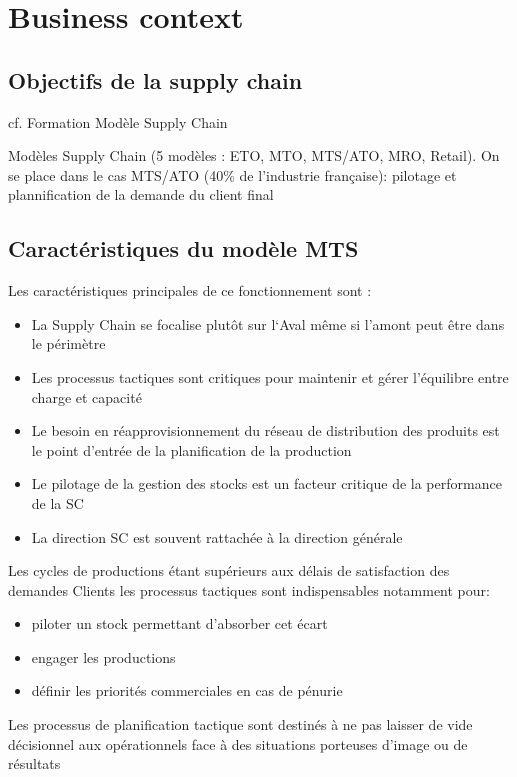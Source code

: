 \chapter{Business context}

\section{Objectifs de la supply chain}

cf. Formation Modèle Supply Chain

Modèles Supply Chain (5 modèles : ETO, MTO, MTS/ATO, MRO, Retail).
On se place dans le cas MTS/ATO (40\% de l'industrie française): pilotage et plannification de la demande du client final

\section{Caractéristiques du modèle MTS}

Les caractéristiques principales de ce fonctionnement sont :
\begin{itemize}
  \item La Supply Chain se focalise plutôt sur l‘Aval même si l’amont peut être dans  le périmètre
  \item Les processus tactiques sont critiques pour maintenir et gérer l’équilibre entre charge et capacité
  \item Le besoin en réapprovisionnement du réseau de distribution des produits est le point d’entrée de la planification de la production
  \item Le pilotage de la gestion des stocks est un facteur critique de la performance de la SC
  \item La direction SC est souvent rattachée à la direction générale
\end{itemize}


Les cycles de productions étant supérieurs aux délais de satisfaction des demandes Clients les processus tactiques sont indispensables notamment pour:
\begin{itemize}
  \item piloter un stock permettant d'absorber cet écart
  \item engager les productions 
  \item définir les priorités commerciales en cas de pénurie
\end{itemize}

Les processus de planification tactique sont destinés à ne pas laisser de vide décisionnel aux opérationnels face à des situations porteuses d'image ou de résultats 

